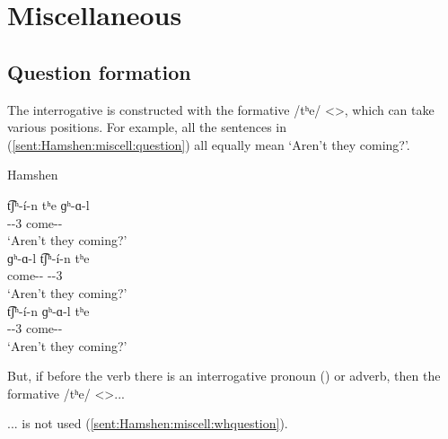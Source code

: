 \section{Miscellaneous}

\subsection{Question formation}

The interrogative is constructed with the formative /tʰe/ <>, which can take various positions. For example, all the sentences in (\ref{sent:Hamshen:miscell:question}) all equally mean `Aren't they coming?'. 

\begin{exe}
	\ex Hamshen \label{sent:Hamshen:miscell:question}
	\begin{xlist}
		\ex \gll t͡ʃʰ-\'i-n tʰe ɡʰ-ɑ-l \\
		{\neggloss}-{\aux}-3{\pl} {\q} come-{\thgloss}-{\cn} \\
		\trans `Aren't they coming?' \\
		\ex \gll ɡʰ-ɑ-l t͡ʃʰ-\'i-n tʰe \\
		come-{\thgloss}-{\cn} {\neggloss}-{\aux}-3{\pl} {\q} \\
		\trans `Aren't they coming?' \\
		\ex \gll t͡ʃʰ-\'i-n ɡʰ-ɑ-l tʰe \\
		{\neggloss}-{\aux}-3{\pl} come-{\thgloss}-{\cn} {\q} \\
		\trans `Aren't they coming?' \\
	\end{xlist}
\end{exe}



But, if before the verb there is an interrogative pronoun () or adverb, then the formative /tʰe/ <>... 


\begin{adjarianpage}\label{page:190}\end{adjarianpage}%

... is not used (\ref{sent:Hamshen:miscell:whquestion}). 


